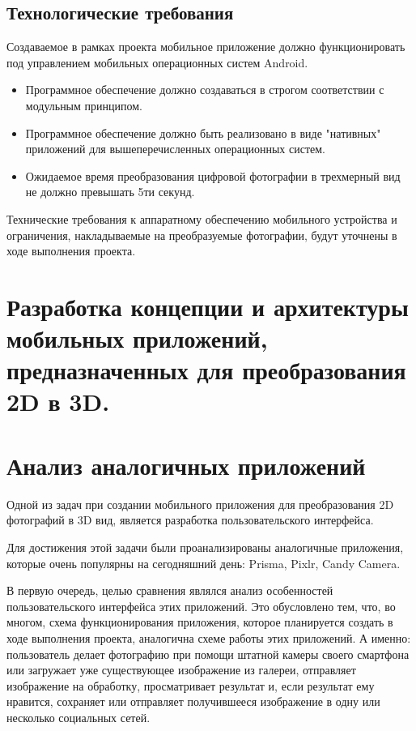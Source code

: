 \subsection{Технологические требования}

Создаваемое в рамках проекта мобильное приложение должно
функционировать под управлением мобильных операционных систем Android.

\begin{itemize}
	\item Программное обеспечение должно создаваться в строгом соответствии с модульным принципом.
	\item Программное обеспечение должно быть реализовано в виде "нативных" приложений для вышеперечисленных операционных систем.
	\item Ожидаемое время преобразования цифровой фотографии в трехмерный вид не должно превышать 5ти секунд. 
\end{itemize}

Технические требования к аппаратному обеспечению мобильного устройства и ограничения, накладываемые на преобразуемые фотографии, будут уточнены в ходе выполнения проекта.

\section{Разработка концепции и архитектуры мобильных приложений, предназначенных для преобразования 2D в 3D.}


\section{Анализ аналогичных приложений}
Одной из задач при создании мобильного приложения для преобразования 2D фотографий в 3D вид, является разработка пользовательского интерфейса.

Для достижения этой задачи были проанализированы аналогичные приложения, которые очень популярны на сегодняшний день: Prisma, Pixlr, Candy Camera.

В первую очередь, целью сравнения являлся анализ особенностей пользовательского интерфейса этих приложений. Это обусловлено тем, что, во многом, схема функционирования приложения, которое планируется создать в ходе выполнения проекта, аналогична схеме работы этих приложений. А именно: пользователь делает фотографию при помощи штатной камеры своего смартфона или загружает уже существующее изображение из галереи, отправляет изображение на обработку, просматривает результат и, если результат ему нравится, сохраняет или отправляет получившееся изображение в одну или несколько социальных сетей.

